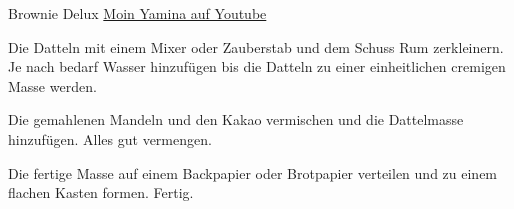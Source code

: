 \begin{recipe}[]{ Brownie Delux }{ \href{https://www.youtube.com/channel/UCR_dfR8wJBmsVkQFDa3PDcQ}{Moin Yamina auf Youtube} }



\step
Die Datteln mit einem Mixer oder Zauberstab und dem Schuss Rum zerkleinern. Je nach bedarf Wasser hinzufügen bis die Datteln zu einer einheitlichen cremigen Masse werden.

\step
Die gemahlenen Mandeln und den Kakao vermischen und die Dattelmasse hinzufügen. Alles gut vermengen.


\step
Die fertige Masse auf einem Backpapier oder Brotpapier verteilen und zu einem flachen Kasten formen. Fertig.


\end{recipe}